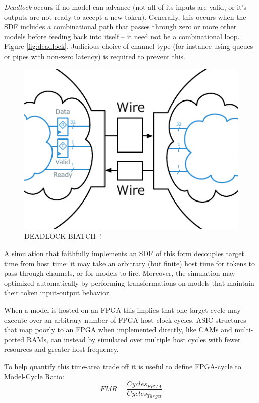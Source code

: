 \emph{Deadlock} occurs if no model can advance (not all of its inputs are
valid, or it's outputs are not ready to accept a new token). Generally, this
occurs when the SDF includes a combinational path that passes through zero or
more other models before feeding back into itself -- it need not be a
combinational loop. Figure \ref{fig:deadlock}. Judicious choice
of channel type (for instance using queues or pipes with non-zero latency) is
required to prevent this.

\begin{figure}
	\centering
	\includegraphics[width=16cm]{figures/deadlock.pdf}
    \caption{DEADLOCK BIATCH~!}
	\label{fig:default-target}
\end{figure}

A simulation that faithfully implements an SDF of this form decouples
target time from host time: it may take an arbitrary (but finite) host time for
tokens to pass through channels, or for models to fire.  Moreover, the
simulation may optimized automatically by performing transformations on models
that maintain their token input-output behavior.

When a model is hosted on an FPGA this implies that one target cycle may
execute over an arbitrary number of FPGA-host clock cycles.  ASIC structures
that map poorly to an FPGA when implemented directly, like CAMs and
multi-ported RAMs, can instead by simulated over multiple host cycles with
fewer resources and greater host frequency.

To help quantify this time-area trade off it is useful to define FPGA-cycle to
Model-Cycle Ratio\cite{APorts}: $$ FMR = \frac{Cycles_{FPGA}}{Cycles_{Target}}
$$


